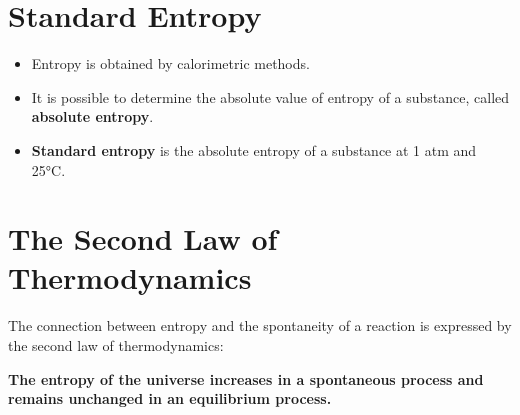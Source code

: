 \documentclass[a4paper,12pt,twocolumn]{article}
\begin{document}
\section{Standard Entropy}
\begin{itemize}
\item Entropy is obtained by calorimetric methods. 
\item It is possible to determine the absolute value of entropy of a substance, called \textbf{absolute entropy}. 
\item \textbf{Standard entropy} is the absolute entropy of a substance at 1 atm and 25°C.
\end{itemize}

\section{The Second Law of Thermodynamics}
    The connection between entropy and the spontaneity of a reaction is expressed by the second law of thermodynamics:
    \begin{Box1}{}
    \textbf{
       The entropy of the universe increases in a spontaneous process and remains unchanged in an equilibrium process.}
     \end{Box1} 
   
\end{document}
